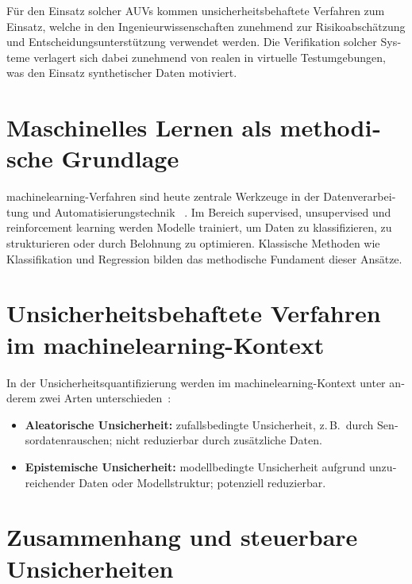 \begin{otherlanguage}{ngerman}
Für den Einsatz solcher AUVs kommen unsicherheitsbehaftete Verfahren zum Einsatz, welche in den Ingenieurwissenschaften zunehmend zur Risikoabschätzung und Entscheidungsunterstützung verwendet werden. Die Verifikation solcher Systeme verlagert sich dabei zunehmend von realen in virtuelle Testumgebungen, was den Einsatz synthetischer Daten motiviert.


\section{Maschinelles Lernen als methodische Grundlage}

\gls{machinelearning}-Verfahren sind heute zentrale Werkzeuge in der Datenverarbeitung und Automatisierungstechnik ~\parencite{Nof2023}. Im Bereich supervised, unsupervised und reinforcement learning werden Modelle trainiert, um Daten zu klassifizieren, zu strukturieren oder durch Belohnung zu optimieren. Klassische Methoden wie Klassifikation und Regression bilden das methodische Fundament dieser Ansätze.

\section{Unsicherheitsbehaftete Verfahren im \gls{machinelearning}-Kontext}

In der Unsicherheitsquantifizierung werden im \gls{machinelearning}-Kontext unter anderem zwei Arten unterschieden~\parencite{Hullermeier2021}:

\begin{itemize}
  \item \textbf{\gls{Aleatorische Unsicherheit}:} zufallsbedingte Unsicherheit, z.\,B.\ durch Sensordatenrauschen; nicht reduzierbar durch zusätzliche Daten.
  \item \textbf{\gls{Epistemische Unsicherheit}:} modellbedingte Unsicherheit aufgrund unzureichender Daten oder Modellstruktur; potenziell reduzierbar.
\end{itemize}


\section{Zusammenhang und steuerbare Unsicherheiten}


\end{otherlanguage}

